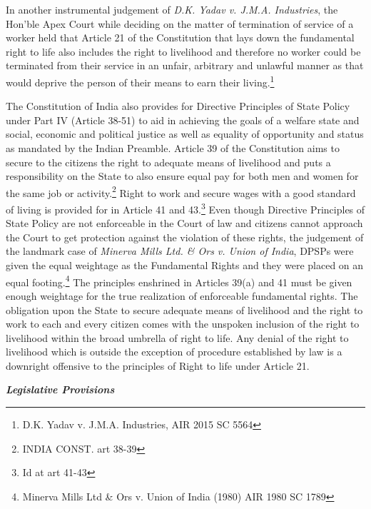 \begin{multicols}{2}
\noi
In another instrumental judgement of \textit{D.K. Yadav v. J.M.A. Industries}, the Hon’ble Apex
Court while deciding on the matter of termination of service of a worker held that Article 21
of the Constitution that lays down the fundamental right to life also includes the right to
livelihood and therefore no worker could be terminated from their service in an unfair, arbitrary and unlawful manner as that would deprive the person of their means to earn their
living.\footnote{D.K. Yadav v. J.M.A. Industries, AIR 2015 SC 5564}

\noi
The Constitution of India also provides for Directive Principles of State Policy under Part IV
(Article 38-51) to aid in achieving the goals of a welfare state and social, economic and
political justice as well as equality of opportunity and status as mandated by the Indian
Preamble. Article 39 of the Constitution aims to secure to the citizens the right to adequate
means of livelihood and puts a responsibility on the State to also ensure equal pay for both
men and women for the same job or activity.\footnote{INDIA CONST. art 38-39} Right to work and secure wages with a good
standard of living is provided for in Article 41 and 43.\footnote{Id at art 41-43} Even though Directive Principles of
State Policy are not enforceable in the Court of law and citizens cannot approach the Court to
get protection against the violation of these rights, the judgement of the landmark case of
\textit{Minerva Mills Ltd. \& Ors v. Union of India}, DPSPs were given the equal weightage as the
Fundamental Rights and they were placed on an equal footing.\footnote{Minerva Mills Ltd \& Ors v. Union of India (1980) AIR 1980 SC 1789} The principles enshrined in
Articles 39(a) and 41 must be given enough weightage for the true realization of enforceable
fundamental rights. The obligation upon the State to secure adequate means of livelihood and
the right to work to each and every citizen comes with the unspoken inclusion of the right to
livelihood within the broad umbrella of right to life. Any denial of the right to livelihood
which is outside the exception of procedure established by law is a downright offensive to the
principles of Right to life under Article 21. 

\noi
{\large\it\bfseries Legislative Provisions}


\end{multicols}
